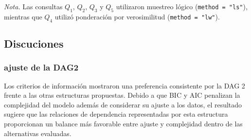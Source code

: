 \documentclass{Academic}
\begin{document}
\begin{table}[htbp]
    \centering
    \caption{Resultados de las consultas probabilísticas realizadas sobre 
    el modelo lineal de la DAG 2.}
    \label{tab:queries_dag2}
    
    
    \begin{flushleft}
        \footnotesize
        \textit{Nota.} 
        Las consultas $Q_1$, $Q_2$, $Q_3$ y $Q_5$ utilizaron muestreo lógico
        (\texttt{method = "ls"}), mientras que $Q_4$ utilizó ponderación por
        verosimilitud (\texttt{method = "lw"}).
    \end{flushleft}
\end{table}


\subsection{Discuciones}
\subsubsection{ajuste de la DAG2}
Los criterios de información mostraron una preferencia consistente por la
DAG 2 frente a las otras estructuras propuestas. Debido a que BIC y AIC
penalizan la complejidad del modelo además de considerar su ajuste a los
datos, el resultado sugiere que las relaciones de dependencia representadas
por esta estructura proporcionan un balance más favorable entre ajuste y
complejidad dentro de las alternativas evaluadas.
\end{document}
